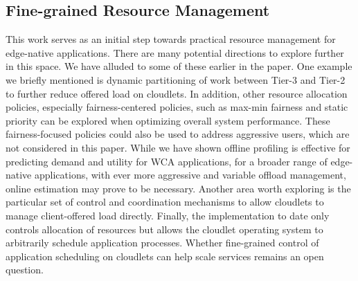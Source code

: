 \subsection{Fine-grained Resource Management}
This work serves as an initial step towards practical resource management for
edge-native applications. There are many potential directions to explore further
in this space. We have alluded to some of these earlier in the paper. One
example we briefly mentioned is dynamic partitioning of work between Tier-3 and
Tier-2 to further reduce offered load on cloudlets.  In addition, other resource
allocation policies, especially fairness-centered policies, such as max-min
fairness and static priority can be explored when optimizing overall system
performance. These fairness-focused policies could also be used to address
aggressive users, which are not considered in this paper.  While we have shown
offline profiling is effective for predicting demand and utility for WCA
applications, for a broader range of edge-native applications, with ever more
aggressive and variable offload management, online estimation may prove to be
necessary. Another area worth exploring is the particular set of control and
coordination mechanisms to allow cloudlets to manage client-offered load
directly. Finally, the implementation to date only controls allocation of
resources but allows the cloudlet operating system to arbitrarily schedule
application processes.  Whether fine-grained control of application scheduling
on cloudlets can help scale services remains an open question.

